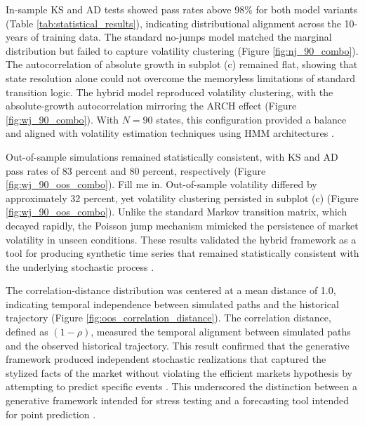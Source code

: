 \documentclass[12pt, letterpaper]{article}
\begin{document}
In-sample KS and AD tests showed pass rates above 98\% for both model variants (Table \ref{tab:statistical_results}), indicating distributional alignment across the 10-years of training data.  The standard no-jumps model matched the marginal distribution but failed to capture volatility clustering (Figure \ref{fig:nj_90_combo}). The autocorrelation of absolute growth in subplot (c) remained flat, showing that state resolution alone could not overcome the memoryless limitations of standard transition logic. The hybrid model reproduced volatility clustering, with the absolute-growth autocorrelation mirroring the ARCH effect (Figure \ref{fig:wj_90_combo}). With $N=90$ states, this configuration provided a balance and aligned with volatility estimation techniques using HMM architectures \cite{rossi_volatility_2006}.

Out-of-sample simulations remained statistically consistent, with KS and AD pass rates of 83 percent and 80 percent, respectively (Figure \ref{fig:wj_90_oos_combo}). Fill me in. Out-of-sample volatility differed by approximately 32 percent, yet volatility clustering persisted in subplot (c) (Figure \ref{fig:wj_90_oos_combo}). Unlike the standard Markov transition matrix, which decayed rapidly, the Poisson jump mechanism mimicked the persistence of market volatility in unseen conditions. These results validated the hybrid framework as a tool for producing synthetic time series that remained statistically consistent with the underlying stochastic process \cite{cont_empirical_2001, ryden_stylized_1998, bulla_stylized_2006}.

The correlation-distance distribution was centered at a mean distance of 1.0, indicating temporal independence between simulated paths and the historical trajectory (Figure \ref{fig:oos_correlation_distance}). The correlation distance, defined as $(1-\rho)$, measured the temporal alignment between simulated paths and the observed historical trajectory. This result confirmed that the generative framework produced independent stochastic realizations that captured the stylized facts of the market without violating the efficient markets hypothesis by attempting to predict specific events \cite{fama_efficient_1970}. This underscored the distinction between a generative framework intended for stress testing and a forecasting tool intended for point prediction \cite{assefa_generating_2021, kwon_can_2024}.


\clearpage
\end{document}
